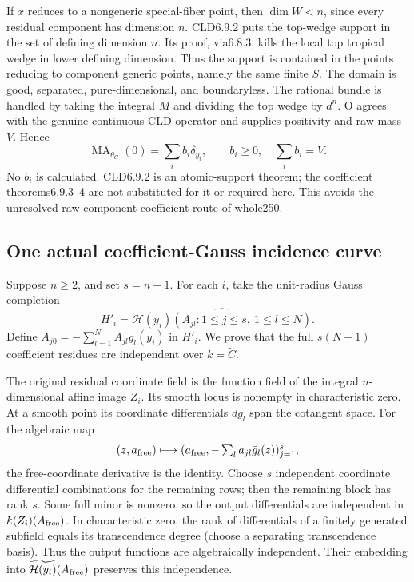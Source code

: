 \documentclass[
  11pt,
]{article}
\begin{document}
If \(x\) reduces to a nongeneric special-fiber point, then \(\dim W<n\),
since every residual component has dimension \(n\). CLD6.9.2 puts the
top-wedge support in the set of defining dimension \(n\). Its proof,
via6.8.3, kills the local top tropical wedge in lower defining
dimension. Thus the support is contained in the points reducing to
component generic points, namely the same finite \(S\). The domain is
good, separated, pure-dimensional, and boundaryless. The rational bundle
is handled by taking the integral \(M\) and dividing the top wedge by
\(d^n\). O agrees with the genuine continuous CLD operator and supplies
positivity and raw mass \(V\). Hence \[
 \operatorname{MA}_{\theta_C}(0)=\sum_i b_i\delta_{y_i},
 \qquad b_i\geq0,\quad\sum_i b_i=V. \tag{5.1}
\] No \(b_i\) is calculated. CLD6.9.2 is an atomic-support theorem; the
coefficient theorems6.9.3--4 are not substituted for it or required
here. This avoids the unresolved raw-component-coefficient route of
whole250.

\subsection{One actual coefficient-Gauss incidence
curve}\label{one-actual-coefficient-gauss-incidence-curve}

Suppose \(n\geq2\), and set \(s=n-1\). For each \(i\), take the
unit-radius Gauss completion \[
 H'_i=\widehat{\mathcal H(y_i)(A_{jl}:1\leq j\leq s,\ 1\leq l\leq N)}.
\] Define \(A_{j0}=-\sum_{l=1}^N A_{jl}g_l(y_i)\) in \(H'_i\). We prove
that the full \(s(N+1)\) coefficient residues are independent over
\(k=\widetilde C\).

The original residual coordinate field is the function field of the
integral \(n\)-dimensional affine image \(Z_i\). Its smooth locus is
nonempty in characteristic zero. At a smooth point its coordinate
differentials \(d\bar g_l\) span the cotangent space. For the algebraic
map \[
 (z,a_{\rm free})\longmapsto
 (a_{\rm free},-\textstyle\sum_l a_{jl}\bar g_l(z))_{j=1}^s,
\] the free-coordinate derivative is the identity. Choose \(s\)
independent coordinate differential combinations for the remaining rows;
then the remaining block has rank \(s\). Some full minor is nonzero, so
the output differentials are independent in \(k(Z_i)(A_{\rm free})\). In
characteristic zero, the rank of differentials of a finitely generated
subfield equals its transcendence degree (choose a separating
transcendence basis). Thus the output functions are algebraically
independent. Their embedding into
\(\widetilde{\mathcal H(y_i)}(A_{\rm free})\) preserves this
independence.
\end{document}

